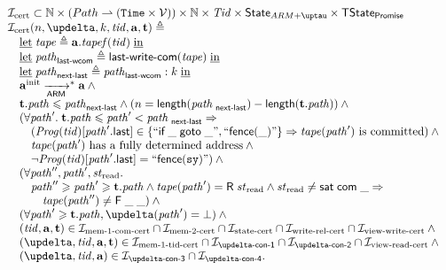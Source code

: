 \[\begin{array}{l}
\invCert \subset \mathbb{N} \times (\Path \rightharpoonup (\Timestamp \times \View))
                            \times \mathbb{N} \times \Tid \times \StateARMtau \times \TStateProm \\
\invCert(n, \delta, k, \tId, \aT, \tT) \triangleq \\
\quad \textLet \tape \triangleq \aT.\tapef(\tId) \; \textIn \\
\quad \textLet \cpath_{\textup{\sf last-wcom}} \triangleq \lastCommittedWrite(\tape) \; \textIn \\
\quad \textLet \cpath_{\textup{\sf next-last}} \triangleq \cpath_{\textup{\sf last-wcom}}:k \; \textIn \\
\quad \ainit \armStepP^{*} \aT \land {} \\
\quad \tT.\cpath \le \cpath_{\textup{\sf next-last}} \land (n = \length(\cpath_{\textup{\sf next-last}}) - \length(\tT.\cpath)) \land {} \\
\quad (\forall \cpath'. \; \tT.\cpath \le \cpath' < \cpath_{\textup{\sf next-last}} \Rightarrow \\
\quad \quad (\Cfprom(\tId)[\lastInstr{\cpath'}] \in \{``\ifGotoInst{\_}{\_}", ``\fenceInst{\_}"\} \Rightarrow
             \tape(\cpath') \text{ is committed}) \land {} \\
\quad \quad \tape(\cpath') \text{ has a fully determined address} \land {} \\
\quad \quad \lnot \Cfprom(\tId)[\lastInstr{\cpath'}] = ``\fenceInst{\SY}") \land {} \\
\quad (\forall \cpath'', \cpath', \Rstate. \\
\quad \quad \cpath'' \ge \cpath' \ge \tT.\cpath \land \tape(\cpath') = \tapeRead{\Rstate} \land
       \Rstate \not = \tapeSatisfied{\Committed}{\_} \Rightarrow \\
\quad \quad \quad \tape(\cpath'') \not = \tapeFence{\_}{\_}) \land {} \\
\quad (\forall \cpath' \ge \tT.\cpath, \delta(\cpath') = \bot) \land {} \\
\quad (\tId, \aT, \tT) \in \invMemOneCERT \cap \invMemTwoCERT \cap \invStateCERT \cap \invViewRelCERT \cap \invViewWriteCERT \land {} \\
\quad (\delta, \tId, \aT, \tT) \in \invMemZeroCERT \cap \invDeltaDefOne \cap \invDeltaDefTwo \cap
               \invViewReadCERT \land {} \\
\quad (\delta, \tId, \aT) \in \invDeltaDefThree \cap \invDeltaDefFour. \\
\end{array}\]

